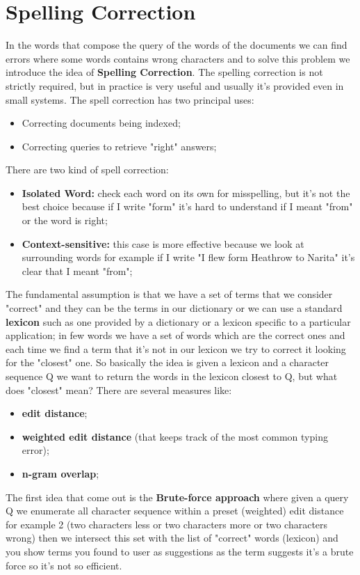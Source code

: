 \chapter{Spelling Correction}
In the words that compose the query of the words of the documents we can find errors where some words contains wrong characters and to solve this problem we introduce the idea of \textbf{Spelling Correction}.
The spelling correction is not strictly required, but in practice is very useful and usually it's provided even in small systems.\newline
The spell correction has two principal uses:
\begin{itemize}
    \item Correcting documents being indexed;
    \item Correcting queries to retrieve "right" answers;
\end{itemize}
There are two kind of spell correction:
\begin{itemize}
    \item \textbf{Isolated Word:} check each word on its own for misspelling, but it's not the best choice because if I write "form" it's hard to understand if I meant "from" or the word is right;
    \item \textbf{Context-sensitive:} this case is more effective because we look at surrounding words for example if I write "I flew form Heathrow to Narita" it's clear that I meant "from";
\end{itemize}
The fundamental assumption is that we have a set of terms that we consider "correct" and they can be the terms in our dictionary or we can use a standard \textbf{lexicon} such as one provided by a dictionary or a lexicon specific to a particular application; in few words we have a set of words which are the correct ones and each time we find a term that it's not in our lexicon we try to correct it looking for the "closest" one.\newline
So basically the idea is given a lexicon and a character sequence Q we want to return the words in the lexicon closest to Q, but what does "closest" mean? There are several measures like:
\begin{itemize}
    \item \textbf{edit distance};
    \item \textbf{weighted edit distance} (that keeps track of the most common typing error);
    \item \textbf{n-gram overlap};
\end{itemize}
The first idea that come out is the \textbf{Brute-force approach} where given a query Q we enumerate all character sequence within a preset (weighted) edit distance for example 2 (two characters less or two characters more or two characters wrong) then we intersect this set with the list of "correct" words (lexicon) and you show terms you found to user as suggestions as the term suggests it's a brute force so it's not so efficient.\newline
